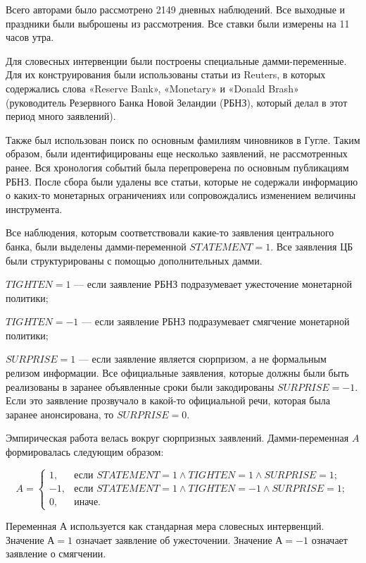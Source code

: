 \documentclass[14pt,a4paper, oneside]{extreport}
\begin{document}
Всего авторами было рассмотрено 2149 дневных наблюдений. Все выходные и праздники были выброшены из рассмотрения. Все ставки были измерены на 11 часов утра. 

Для словесных интервенции были построены специальные дамми-переменные. Для их конструирования были использованы статьи из Reuters, в которых содержались слова «Reserve Bank», «Monetary» и «Donald Brash» (руководитель Резервного Банка Новой Зеландии (РБНЗ), который делал в этот период много заявлений).

Также был использован поиск по основным фамилиям чиновников в Гугле. Таким образом, были идентифицированы еще несколько заявлений, не рассмотренных ранее. Вся хронология событий была перепроверена по основным публикациям РБНЗ. После сбора были удалены все статьи, которые не содержали информацию о каких-то монетарных ограничениях или сопровождались изменением величины инструмента.

Все наблюдения, которым соответствовали какие-то заявления центрального банка, были выделены дамми-переменной $STATEMENT = 1$. Все заявления ЦБ были структурированы с помощью дополнительных дамми.

$TIGHTEN=1$ --- если заявление РБНЗ подразумевает ужесточение монетарной политики;

$TIGHTEN=-1$ ---  если заявление РБНЗ подразумевает смягчение монетарной политики;

$SURPRISE = 1$ ---  если заявление является сюрпризом, а не формальным релизом информации. Все официальные заявления, которые должны были быть реализованы в заранее объявленные сроки были закодированы $SURPRISE = -1$. Если это заявление прозвучало в какой-то официальной речи, которая была заранее анонсирована, то $SURPRISE = 0$. 

Эмпирическая работа велась вокруг сюрпризных заявлений. Дамми-переменная $A$ формировалась следующим образом:

\begin{equation}
A = \begin{cases}
1,&\text{если } STATEMENT=1 \wedge TIGHTEN=1 \wedge SURPRISE =1;\\
-1,&\text{если }  STATEMENT=1 \wedge TIGHTEN=-1 \wedge SURPRISE =1;\\
0,&\text{иначе.}
\end{cases}
\end{equation}

Переменная А используется как стандарная мера словесных интервенций. Значение $А=1$ означает заявление об ужесточении. Значение  $А= -1$ означает заявление о смягчении.  
\end{document}

